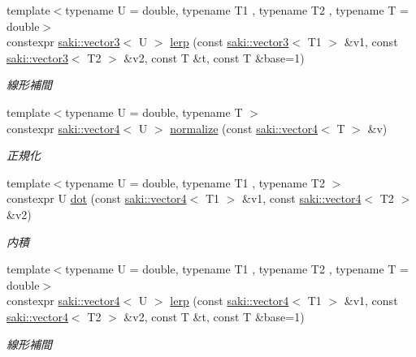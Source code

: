 \begin{DoxyCompactItemize}
{\footnotesize template$<$typename U  = double, typename T1 , typename T2 , typename T  = double$>$ }\\constexpr \mbox{\hyperlink{classsaki_1_1vector3}{saki\+::vector3}}$<$ U $>$ \mbox{\hyperlink{namespacesaki_a1dc5233651ca71b38ed5a53ef304e480}{lerp}} (const \mbox{\hyperlink{classsaki_1_1vector3}{saki\+::vector3}}$<$ T1 $>$ \&v1, const \mbox{\hyperlink{classsaki_1_1vector3}{saki\+::vector3}}$<$ T2 $>$ \&v2, const T \&t, const T \&base=1)
\begin{DoxyCompactList}\small\item\em 線形補間 \end{DoxyCompactList}\item 
{\footnotesize template$<$typename U  = double, typename T $>$ }\\constexpr \mbox{\hyperlink{classsaki_1_1vector4}{saki\+::vector4}}$<$ U $>$ \mbox{\hyperlink{namespacesaki_afcef74d7e32ef8cf446d075beeed4b41}{normalize}} (const \mbox{\hyperlink{classsaki_1_1vector4}{saki\+::vector4}}$<$ T $>$ \&v)
\begin{DoxyCompactList}\small\item\em 正規化 \end{DoxyCompactList}\item 
{\footnotesize template$<$typename U  = double, typename T1 , typename T2 $>$ }\\constexpr U \mbox{\hyperlink{namespacesaki_a990ff61a01d4cf819df3fe2774842acf}{dot}} (const \mbox{\hyperlink{classsaki_1_1vector4}{saki\+::vector4}}$<$ T1 $>$ \&v1, const \mbox{\hyperlink{classsaki_1_1vector4}{saki\+::vector4}}$<$ T2 $>$ \&v2)
\begin{DoxyCompactList}\small\item\em 内積 \end{DoxyCompactList}\item 
{\footnotesize template$<$typename U  = double, typename T1 , typename T2 , typename T  = double$>$ }\\constexpr \mbox{\hyperlink{classsaki_1_1vector4}{saki\+::vector4}}$<$ U $>$ \mbox{\hyperlink{namespacesaki_acc3cd6d8e07cbfcd2691c4d9ffe25416}{lerp}} (const \mbox{\hyperlink{classsaki_1_1vector4}{saki\+::vector4}}$<$ T1 $>$ \&v1, const \mbox{\hyperlink{classsaki_1_1vector4}{saki\+::vector4}}$<$ T2 $>$ \&v2, const T \&t, const T \&base=1)
\begin{DoxyCompactList}\small\item\em 線形補間 \end{DoxyCompactList}\end{DoxyCompactItemize}


